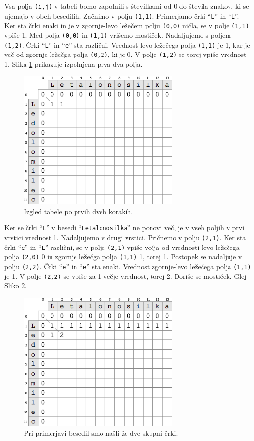 \documentclass[a4paper, 12pt, twoside]{book}
\begin{document}
Vsa polja {\tt (i,j)} v tabeli bomo zapolnili s številkami od 0 do števila znakov, ki se ujemajo v obeh besedilih.
Začnimo v polju {\tt (1,1)}. Primerjamo črki “{\tt L}” in “{\tt L}”. Ker sta črki enaki in je v zgornje-levo ležečem polju {\tt (0,0)} ničla, se v polje {\tt (1,1)} vpiše 1. Med polja {\tt (0,0)} in {\tt (1,1)} vrišemo mostiček. Nadaljujemo s poljem {\tt (1,2)}. Črki “{\tt L}” in “{\tt e}” sta različni. Vrednost levo ležečega polja {\tt (1,1)} je 1, kar je več od zgornje ležečga polja {\tt (0,2)}, ki je 0. V polje {\tt (1,2)} se torej vpiše vrednost 1. Slika \ref{lcs2} prikazuje izpolnjena prva dva polja.

\begin{figure}[placement h]
\begin{center}
\includegraphics[width=8cm]{lcs2.png}
\end{center}
\caption{Izgled tabele po prvih dveh korakih.}
\label{lcs2}
\end{figure}

Ker se črki “{\tt L}” v besedi “{\tt Letalonosilka}” ne ponovi več, je v vseh poljih v prvi vrstici vrednost 1. Nadaljujemo v drugi vrstici. Pričnemo v polju {\tt (2,1)}. Ker sta črki “{\tt e}” in “{\tt L}” različni, se v polje {\tt (2,1)} vpiše večja od vrednosti levo ležečega polja {\tt (2,0)} 0 in zgornje ležečga polja {\tt (1,1)} 1, torej 1. Postopek se nadaljuje v polju {\tt (2,2)}. Črki “{\tt e}” in “{\tt e}” sta enaki. Vrednost zgornje-levo ležečega polja {\tt (1,1)} je 1. V polje {\tt (2,2)} se vpiše za 1 večje vrednost, torej 2. Doriše se mostiček. Glej Sliko \ref{lcs3}.

\begin{figure}[placement h]
\begin{center}
\includegraphics[width=8cm]{lcs3.png}
\end{center}
\caption{Pri primerjavi besedil smo našli že dve skupni črki.}
\label{lcs3}
\end{figure}
\end{document}
